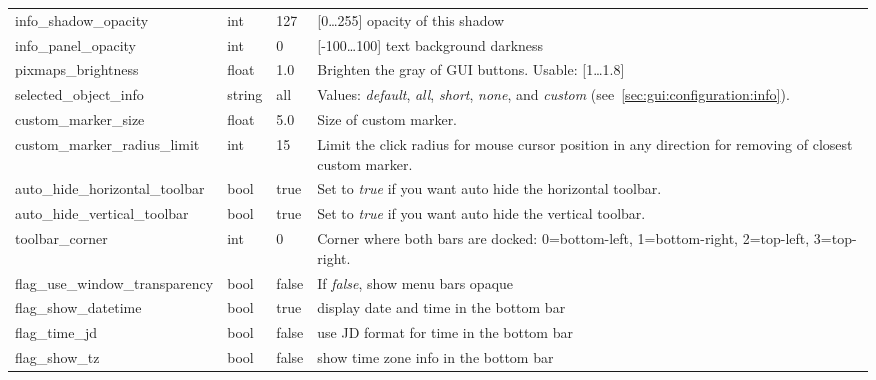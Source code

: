 \begin{longtable}{p{50mm}|l|l|p{55mm}}
info\_shadow\_opacity                  & int   & 127   & [0\ldots255] opacity of this shadow\\
info\_panel\_opacity                   & int   & 0     & [-100\ldots100] text background darkness\\
pixmaps\_brightness                    & float & 1.0   & Brighten the gray of GUI buttons. Usable: [1\ldots1.8]\\\midrule
%
selected\_object\_info            & string & all  & Values: \emph{default}, \emph{all}, \emph{short}, \emph{none}, 
                                                    and \emph{custom} (see~\ref{sec:gui:configuration:info}).\\\midrule
custom\_marker\_size             & float   & 5.0 & Size of custom marker.\\%
custom\_marker\_radius\_limit    & int   & 15 & Limit the click radius for mouse cursor position in any direction for removing of closest custom marker.\\\midrule
auto\_hide\_horizontal\_toolbar & bool   & true  & Set to \emph{true} if you want auto hide the horizontal toolbar.\\%
auto\_hide\_vertical\_toolbar   & bool   & true  & Set to \emph{true} if you want auto hide the vertical toolbar.\\%
toolbar\_corner                 & int    & 0     & Corner where both bars are docked: 0=bottom-left, 1=bottom-right, 2=top-left, 3=top-right.\\%
flag\_use\_window\_transparency & bool   & false & If \emph{false}, show menu bars opaque\\%
flag\_show\_datetime            & bool   & true  & display date and time in the bottom bar\\%
flag\_time\_jd                  & bool   & false & use JD format for time in the bottom bar\\%
flag\_show\_tz                  & bool   & false & show time zone info in the bottom bar\\%

\end{longtable}
